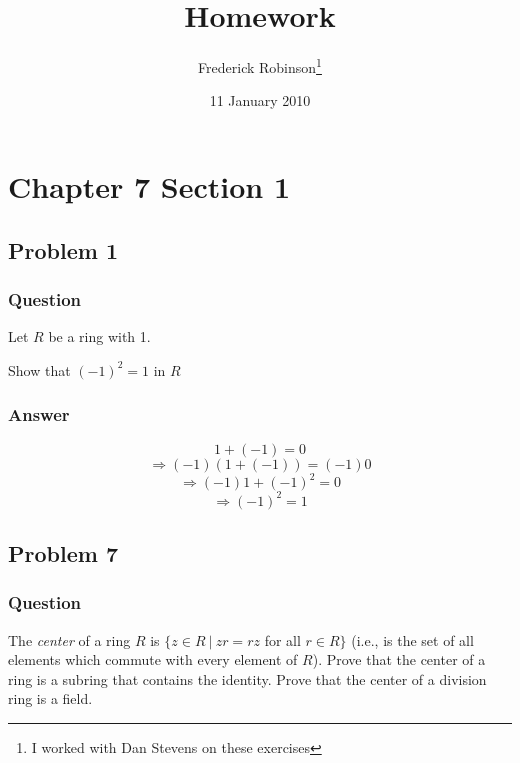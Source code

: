 \documentclass[12pt]{article}
\title{Homework}
\author{Frederick Robinson\footnote{I worked with Dan Stevens on these exercises}}
\date{11 January 2010}
\begin{document}

   \maketitle

\setcounter{tocdepth}{2} 

\tableofcontents

\section{Chapter 7 Section 1}
\subsection{Problem 1}

\subsubsection{Question}
Let $R$ be a ring with 1.

Show that $(-1)^2=1$ in $R$
\subsubsection{Answer}
\[1+(-1)=0\]
\[\Rightarrow (-1)(1+(-1))=(-1)0\]
\[\Rightarrow (-1)1+(-1)^2=0\]
\[\Rightarrow (-1)^2=1\]

\subsection{Problem 7}

\subsubsection{Question}
The \emph{center} of a ring $R$ is $\{z \in R\ |\ zr =rz$ for all $r\in R\}$ (i.e., is the set of all elements which commute with every element of $R$). Prove that the center of a ring is a subring that contains the identity. Prove that the center of a division ring is a field.
\end{document}
